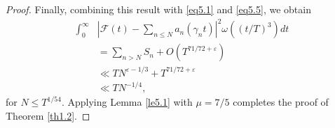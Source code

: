 \documentclass[10pt,leqno]{amsart}
\numberwithin{equation}{section}
\begin{document}
\begin{proof}
Finally, combining this result with \eqref{eq5.1} and \eqref{eq5.5}, we obtain
\begin{equation}\label{eq510}
\begin{aligned}
\int_0^{\infty} &\left| \mathcal{F}(t) - \sum_{n \le N} a_n(\gamma_n t) \right|^2 \omega \left((t/T)^3\right) dt \\
&= \sum_{n>N} S_n + O \left(T^{71/72+\varepsilon}\right) \\
&\ll T N^{\varepsilon-1/3} + T^{71/72+\varepsilon} \\
&\ll T N^{-1/4},
\end{aligned}
\end{equation}
for $N \le T^{1/54}$. Applying Lemma \ref{le5.1} with $\mu = 7/5$ completes the proof of Theorem \ref{th1.2}.
\end{proof}
\end{document}
